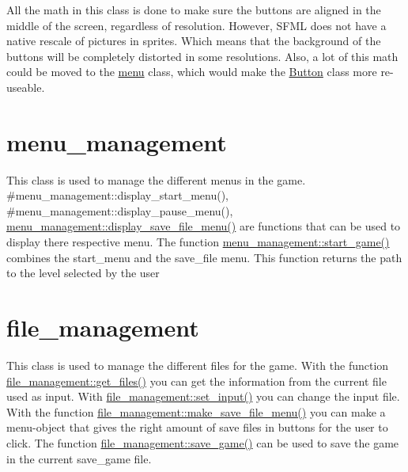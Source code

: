 All the math in this class is done to make sure the buttons are aligned in the middle of the screen, regardless of resolution. However, S\+F\+ML does not have a native rescale of pictures in sprites. Which means that the background of the buttons will be completely distorted in some resolutions. Also, a lot of this math could be moved to the \hyperlink{classmenu}{menu} class, which would make the \hyperlink{class_button}{Button} class more re-\/useable.\hypertarget{index_menu_management}{}\section{menu\+\_\+management}\label{index_menu_management}
This class is used to manage the different menu\textquotesingle{}s in the game. \#menu\+\_\+management\+::display\+\_\+start\+\_\+menu(), \#menu\+\_\+management\+::display\+\_\+pause\+\_\+menu(), \hyperlink{classmenu__management_ac64c1eace3d955be8623a1129597dc54}{menu\+\_\+management\+::display\+\_\+save\+\_\+file\+\_\+menu()} are functions that can be used to display there respective menu. The function \hyperlink{classmenu__management_a92d22f059d33ccc5c3ae485804fd5fbb}{menu\+\_\+management\+::start\+\_\+game()} combines the start\+\_\+menu and the save\+\_\+file menu. This function returns the path to the level selected by the user\hypertarget{index_file_management}{}\section{file\+\_\+management}\label{index_file_management}
This class is used to manage the different files for the game. With the function \hyperlink{classfile__management_a6c3f90ce958156adea878510097d64ef}{file\+\_\+management\+::get\+\_\+files()} you can get the information from the current file used as input. With \hyperlink{classfile__management_a090d9aba4dd5a795428ccbfe8d4037e6}{file\+\_\+management\+::set\+\_\+input()} you can change the input file. With the function \hyperlink{classfile__management_a97eda13bca5dbe703663bf81f83a77a0}{file\+\_\+management\+::make\+\_\+save\+\_\+file\+\_\+menu()} you can make a menu-\/object that gives the right amount of save files in buttons for the user to click. The function \hyperlink{classfile__management_a79e6ae7cec63aa959d7d0730d6ffa5a3}{file\+\_\+management\+::save\+\_\+game()} can be used to save the game in the current save\+\_\+game file. 